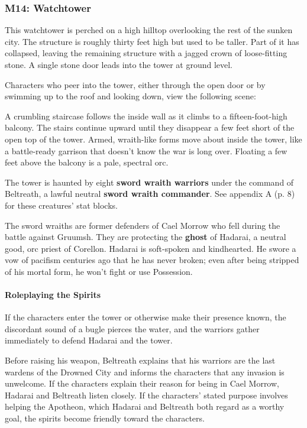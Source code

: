\documentclass[letterpaper, 11pt, bg=full, twocolumn]{dndbook}
\begin{document}
\subsubsection{M14: Watchtower}

\begin{DndReadAloud}
This watchtower is perched on a high hilltop overlooking the rest of the sunken city. The structure is roughly thirty feet high but used to be taller. Part of it has collapsed, leaving the remaining structure with a jagged crown of loose-fitting stone. A single stone door leads into the tower at ground level.
\end{DndReadAloud}

Characters who peer into the tower, either through the open door or by swimming up to the roof and looking down, view the following scene:

\begin{DndReadAloud}
A crumbling staircase follows the inside wall as it climbs to a fifteen-foot-high balcony. The stairs continue upward until they disappear a few feet short of the open top of the tower. Armed, wraith-like forms move about inside the tower, like a battle-ready garrison that doesn't know the war is long over. Floating a few feet above the balcony is a pale, spectral orc.
\end{DndReadAloud}

The tower is haunted by eight \textbf{sword wraith warriors} under the command of Beltreath, a lawful neutral \textbf{sword wraith commander}. See appendix A (p. 8) for these creatures' stat blocks.

The sword wraiths are former defenders of Cael Morrow who fell during the battle against Gruumsh. They are protecting the \textbf{ghost} of Hadarai, a neutral good, orc priest of Corellon. Hadarai is soft-spoken and kindhearted. He swore a vow of pacifism centuries ago that he has never broken; even after being stripped of his mortal form, he won't fight or use Possession.

\paragraph{Roleplaying the Spirits}

If the characters enter the tower or otherwise make their presence known, the discordant sound of a bugle pierces the water, and the warriors gather immediately to defend Hadarai and the tower.

Before raising his weapon, Beltreath explains that his warriors are the last wardens of the Drowned City and informs the characters that any invasion is unwelcome. If the characters explain their reason for being in Cael Morrow, Hadarai and Beltreath listen closely. If the characters' stated purpose involves helping the Apotheon, which Hadarai and Beltreath both regard as a worthy goal, the spirits become friendly toward the characters.
\end{document}
